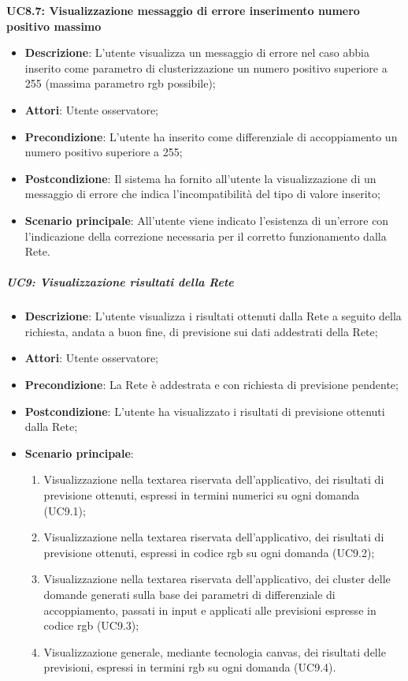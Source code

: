 \textbf{UC8.7: Visualizzazione messaggio di errore inserimento numero positivo massimo}\mbox{}
\label{UC8.7: Visualizzazione messaggio di errore per inserimento numero positivo massimo}
\noindent
\begin{itemize}
\item \textbf{Descrizione}: L'utente visualizza un messaggio di errore nel caso abbia inserito come parametro di clusterizzazione un numero positivo superiore a 255 (massima parametro rgb possibile);
\item \textbf{Attori}: Utente osservatore;
\item \textbf{Precondizione}: L'utente ha inserito come differenziale di accoppiamento un numero positivo superiore a 255;
\item \textbf{Postcondizione}: Il sistema ha fornito all'utente la visualizzazione di un messaggio di errore che indica  l'incompatibilit\`a del tipo di valore inserito;
\item \textbf{Scenario principale}: All'utente viene indicato l'esistenza di un'errore con l'indicazione della correzione necessaria per il corretto funzionamento dalla Rete.
\end{itemize}

\subparagraph{UC9: Visualizzazione risultati della Rete}\mbox{}
\label{UC9: Visualizzazione risultati della Rete}
\noindent
\begin{itemize}
\item \textbf{Descrizione}: L'utente visualizza i risultati ottenuti dalla Rete a seguito della richiesta, andata a buon fine, di previsione sui dati addestrati della Rete;
\item \textbf{Attori}: Utente osservatore;
\item \textbf{Precondizione}: La Rete \`e addestrata e con richiesta di previsione pendente;
\item \textbf{Postcondizione}: L'utente ha visualizzato i risultati di previsione ottenuti dalla Rete; 
\item \textbf{Scenario principale}:
\begin{enumerate}
\item Visualizzazione nella textarea riservata dell'applicativo, dei risultati di previsione ottenuti, espressi in termini numerici su ogni domanda (UC9.1);
\item Visualizzazione nella textarea riservata dell'applicativo, dei risultati di previsione ottenuti, espressi in codice rgb su ogni domanda (UC9.2);
\item Visualizzazione nella textarea riservata dell'applicativo, dei cluster delle domande generati sulla base dei parametri di differenziale di accoppiamento, passati in input e applicati alle previsioni espresse in codice rgb (UC9.3);
\item Visualizzazione generale, mediante tecnologia canvas, dei risultati delle previsioni, espressi in termini rgb su ogni domanda (UC9.4).
\end{enumerate}
\end{itemize}

